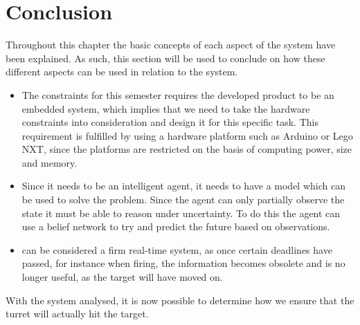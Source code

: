 \section{Conclusion}\label{EmbConc}

Throughout this chapter the basic concepts of each aspect of the system have
been explained. As such, this section will be used to conclude on how these
different aspects can be used in relation to the \name system.

\begin{itemize}
  \item The constraints for this semester requires the developed product to be
  an embedded system, which implies that we need to take the hardware
  constraints into consideration and design it for this specific task. This
  requirement is fulfilled by using a hardware platform such as Arduino or Lego
  NXT, since the platforms are restricted on the basis of computing power, size
  and memory.
  \item Since it needs to be an intelligent agent, it needs to have a model
  which can be used to solve the problem. Since the agent can only partially
  observe the state it must be able to reason under uncertainty. To do this the
  agent can use a belief network to try and predict the future based on
  observations.
  \item \name can be considered a firm real-time system, as once certain
  deadlines have passed, for instance when firing, the information becomes
  obsolete and is no longer useful, as the target will have moved on. 
\end{itemize}  

With the system analysed, it is now possible to determine how we ensure that
the turret will actually hit the target.


% 
